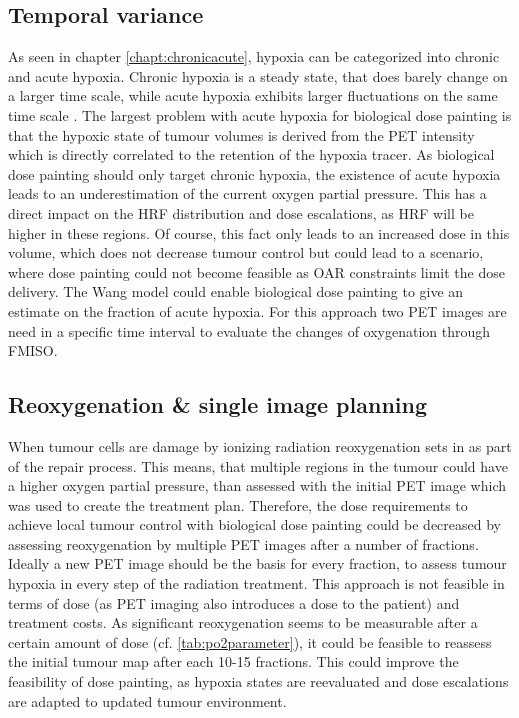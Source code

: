 \subsection{Temporal variance}
As seen in chapter \ref{chapt:chronicacute}, hypoxia can be categorized into chronic and acute hypoxia. Chronic hypoxia is a steady state, that does barely change on a larger time scale, while acute hypoxia exhibits larger fluctuations on the same time scale \cite{pmid9783887, pmid18086391,pmid19203843, pmid15234030, pmid17543402, pmid16098619, pmid17674980, pmid18313529}. The largest problem with acute hypoxia for biological dose painting is that the hypoxic state of tumour volumes is derived from the PET intensity which is directly correlated to the retention of the hypoxia tracer. As biological dose painting should only target chronic hypoxia, the existence of acute hypoxia leads to an underestimation of the current oxygen partial pressure. This has a direct impact on the HRF distribution and dose escalations, as HRF will be higher in these regions. Of course, this fact only leads to an increased dose in this volume, which does not decrease tumour control but could lead to a scenario, where dose painting could not become feasible as OAR constraints limit the dose delivery. The Wang model \cite{pmid19928070} could enable biological dose painting to give an estimate on the fraction of acute hypoxia. For this approach two PET images are need in a specific time interval to evaluate the changes of oxygenation through FMISO.
\subsection{Reoxygenation \& single image planning}
When tumour cells are damage by ionizing radiation reoxygenation sets in as part of the repair process. This means, that multiple regions in the tumour could have a higher oxygen partial pressure, than assessed with the initial PET image which was used to create the treatment plan. Therefore, the dose requirements to achieve local tumour control with biological dose painting could be decreased by assessing reoxygenation by multiple PET images after a number of fractions. Ideally a new PET image should be the basis for every fraction, to assess tumour hypoxia in every step of the radiation treatment. This approach is not feasible in terms of dose (as PET imaging also introduces a dose to the patient) and treatment costs. As significant reoxygenation seems to be measurable after a certain amount of dose (cf. \ref{tab:po2parameter}), it could be feasible to reassess the initial tumour map after each 10-15 fractions. This could improve the feasibility of dose painting, as hypoxia states are reevaluated and dose escalations are adapted to updated tumour environment. 
